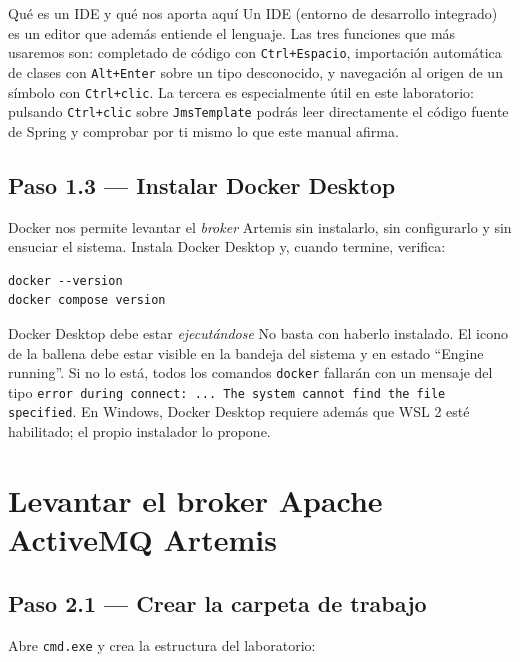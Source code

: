 \documentclass[11pt,a4paper]{book}
\newcommand{\clase}[1]{\texttt{#1}}
\begin{document}
\begin{cajaNota}{Qué es un IDE y qué nos aporta aquí}
	Un IDE (entorno de desarrollo integrado) es un editor que además entiende el lenguaje.
	Las tres funciones que más usaremos son: completado de código con \texttt{Ctrl+Espacio}, importación automática de clases con \texttt{Alt+Enter} sobre un tipo desconocido, y navegación al origen de un símbolo con \texttt{Ctrl+clic}.
	La tercera es especialmente útil en este laboratorio: pulsando \texttt{Ctrl+clic} sobre \clase{JmsTemplate} podrás leer directamente el código fuente de Spring y comprobar por ti mismo lo que este manual afirma.
\end{cajaNota}

\section{Paso 1.3 --- Instalar Docker Desktop}

Docker nos permite levantar el \emph{broker} Artemis sin instalarlo, sin configurarlo y sin ensuciar el sistema.
Instala Docker Desktop y, cuando termine, verifica:

\begin{lstlisting}[language=consola,caption={Verificación de Docker},label={lst:verdocker}]
docker --version
docker compose version
\end{lstlisting}

\begin{cajaAviso}{Docker Desktop debe estar \emph{ejecutándose}}
	No basta con haberlo instalado.
	El icono de la ballena debe estar visible en la bandeja del sistema y en estado ``Engine running''.
	Si no lo está, todos los comandos \texttt{docker} fallarán con un mensaje del tipo \texttt{error during connect: ... The system cannot find the file specified}.
	En Windows, Docker Desktop requiere además que WSL 2 esté habilitado; el propio instalador lo propone.
\end{cajaAviso}

\chapter{Levantar el broker Apache ActiveMQ Artemis}
\label{cap:broker}

\section{Paso 2.1 --- Crear la carpeta de trabajo}

Abre \texttt{cmd.exe} y crea la estructura del laboratorio:
\end{document}
